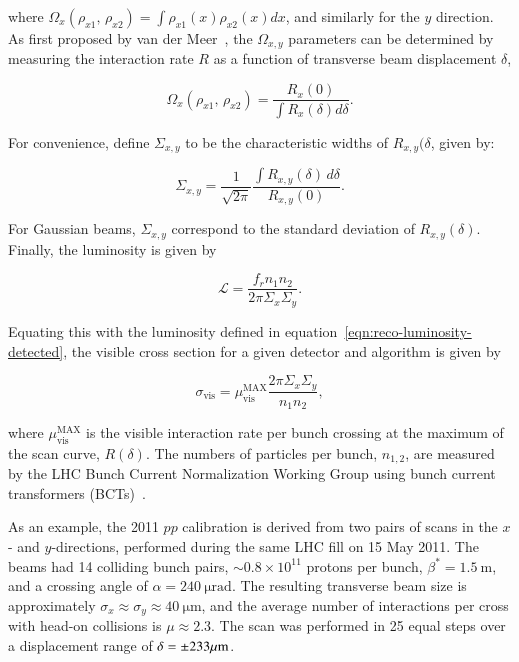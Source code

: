 where $\Omega_x(\rho_{x1},\,\rho_{x2})=\int \rho_{x1}(x) \rho_{x2}(x) dx$, and similarly for the $y$ direction. As first proposed by van der Meer~\cite{vdm}, the $\Omega_{x,y}$ parameters can be determined by measuring the interaction rate $R$ as a function of transverse beam displacement $\delta$,

\begin{equation}
	\Omega_x (\rho_{x1},\,\rho_{x2}) = \frac{R_x(0)}{\int R_x(\delta) d\delta}.
\end{equation}

For convenience, define $\Sigma_{x,y}$ to be the characteristic widths of $R_{x,y}(\delta$, given by:

\begin{equation}\label{eqn:reco-luminosity-CapSigma}
	\Sigma_{x,y}=\frac{1}{\sqrt{2\pi}} \frac{\int R_{x,y}(\delta)\,d\delta}{R_{x,y}(0)}.
\end{equation}

For Gaussian beams, $\Sigma_{x,y}$ correspond to the standard deviation of $R_{x,y}(\delta)$. Finally, the luminosity is given by

\begin{equation}
	\mathcal{L} = \frac{f_r n_1 n_2}{2\pi \Sigma_x \Sigma_y}.
\end{equation}

Equating this with the luminosity defined in equation~\ref{eqn:reco-luminosity-detected}, the visible cross section for a given detector and algorithm is given by

\begin{equation}
	\sigma_{\mathrm{vis}} = \mu_{\mathrm{vis}}^{\mathrm{MAX}} \frac{2\pi \Sigma_x \Sigma_y}{n_1 n_2},
\end{equation}

where $\mu_{\mathrm{vis}}^{\mathrm{MAX}}$ is the visible interaction rate per bunch crossing at the maximum of the scan curve, $R(\delta)$. The numbers of particles per bunch, $n_{1,2}$, are measured by the LHC Bunch Current Normalization Working Group using bunch current transformers (BCTs)~\cite{BCNWG}. 

As an example, the 2011 $pp$ calibration is derived from two pairs of scans in the $x$- and $y$-directions, performed during the same LHC fill on 15 May 2011. The beams had 14 colliding bunch pairs, $\sim0.8\times 10^11$ protons per bunch, $\beta^*=\SI{1.5}{\meter}$, and a crossing angle of $\alpha=\SI{240}{\micro\radian}$. The resulting transverse beam size is approximately $\sigma_{x}\approx\sigma_{y}\approx \SI{40}{\micro\meter}$, and the average number of interactions per cross with head-on collisions is $\mu\approx 2.3$. The scan was performed in 25 equal steps over a displacement range of $\delta=\pm 233 \mu\mathrm{m}$.

